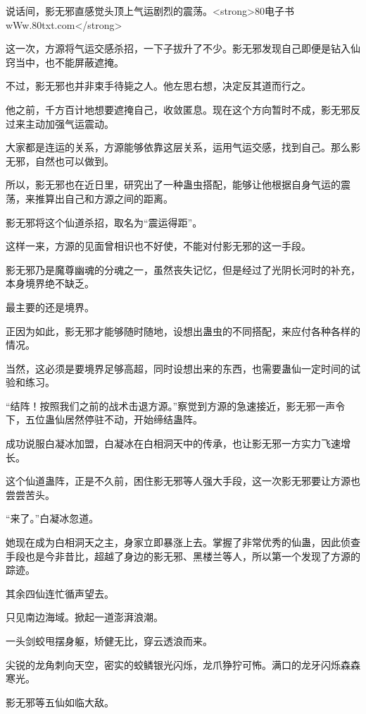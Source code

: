
\begin{this_body}

说话间，影无邪直感觉头顶上气运剧烈的震荡。<strong>80电子书wWw.80txt.com</strong>

这一次，方源将气运交感杀招，一下子拔升了不少。影无邪发现自己即便是钻入仙窍当中，也不能屏蔽遮掩。

不过，影无邪也并非束手待毙之人。他左思右想，决定反其道而行之。

他之前，千方百计地想要遮掩自己，收敛匿息。现在这个方向暂时不成，影无邪反过来主动加强气运震动。

大家都是连运的关系，方源能够依靠这层关系，运用气运交感，找到自己。那么影无邪，自然也可以做到。

所以，影无邪也在近日里，研究出了一种蛊虫搭配，能够让他根据自身气运的震荡，来推算出自己和方源之间的距离。

影无邪将这个仙道杀招，取名为“震运得距”。

这样一来，方源的见面曾相识也不好使，不能对付影无邪的这一手段。

影无邪乃是魔尊幽魂的分魂之一，虽然丧失记忆，但是经过了光阴长河时的补充，本身境界绝不缺乏。

最主要的还是境界。

正因为如此，影无邪才能够随时随地，设想出蛊虫的不同搭配，来应付各种各样的情况。

当然，这必须是要境界足够高超，同时设想出来的东西，也需要蛊仙一定时间的试验和练习。

“结阵！按照我们之前的战术击退方源。”察觉到方源的急速接近，影无邪一声令下，五位蛊仙居然停驻不动，开始缔结蛊阵。

成功说服白凝冰加盟，白凝冰在白相洞天中的传承，也让影无邪一方实力飞速增长。

这个仙道蛊阵，正是不久前，困住影无邪等人强大手段，这一次影无邪要让方源也尝尝苦头。

“来了。”白凝冰忽道。

她现在成为白相洞天之主，身家立即暴涨上去。掌握了非常优秀的仙蛊，因此侦查手段也是今非昔比，超越了身边的影无邪、黑楼兰等人，所以第一个发现了方源的踪迹。

其余四仙连忙循声望去。

只见南边海域。掀起一道澎湃浪潮。

一头剑蛟甩摆身躯，矫健无比，穿云透浪而来。

尖锐的龙角刺向天空，密实的蛟鳞银光闪烁，龙爪狰狞可怖。满口的龙牙闪烁森森寒光。

影无邪等五仙如临大敌。


\end{this_body}
